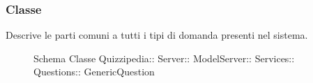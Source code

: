 \subsubsection{Classe }
Descrive le parti comuni a tutti i tipi di domanda presenti nel sistema.
\begin{figure}[H]
\centering
\noindent{}
\caption[Schema Classe GenericQuestion]{Schema Classe Quizzipedia:: Server:: ModelServer:: Services:: Questions:: GenericQuestion}
\end{figure}
